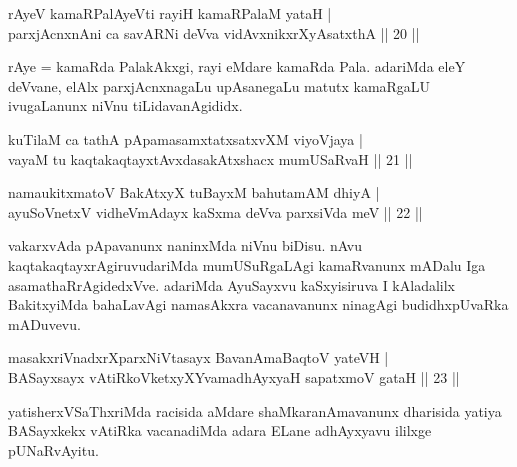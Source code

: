 \begin{shl}
rAyeV kamaRPalAyeVti rayiH kamaRPalaM yataH | \\
parxjAcnxnAni ca savARNi deVva vidAvxnikxrXyAsatxthA \hfill||  20 ||
\end{shl}

\begin{artha} 
rAye = kamaRda PalakAkxgi, rayi eMdare kamaRda Pala. adariMda eleY 
deVvane, elAlx parxjAcnxnagaLu upAsanegaLu matutx kamaRgaLU 
ivugaLanunx niVnu tiLidavanAgididx.
\end{artha}

\begin{shl}
kuTilaM ca tathA pApamasamxtatxsatxvXM viyoVjaya | \\
vayaM tu kaqtakaqtayxtAvxdasakAtxshacx mumUSaRvaH \hfill||  21 || 
\end{shl}

\begin{shl}
namaukitxmatoV BakAtxyX tuBayxM bahutamAM dhiyA | \\
ayuSoV\s netxV vidheVmAdayx kaSxma deVva parxsiVda meV \hfill||  22 || 
\end{shl}

\begin{artha} 
vakarxvAda pApavanunx naninxMda niVnu biDisu. nAvu 
kaqtakaqtayxrAgiruvudariMda mumUSuRgaLAgi kamaRvanunx mADalu Iga 
asamathaRrAgidedxVve. adariMda AyuSayxvu kaSxyisiruva I kAladalilx 
BakitxyiMda bahaLavAgi namasAkxra vacanavanunx ninagAgi budidhxpUvaRka 
mADuvevu.
\end{artha}


\begin{shl}
masakxriVnadxrXparxNiVtasayx BavanAmaBaqtoV yateVH | \\
BASayxsayx vAtiRkoVketxyXYvamadhAyxyaH sapatxmoV gataH \hfill||  23 || 
\end{shl}

\begin{artha} 
yatisherxVSaThxriMda racisida aMdare shaMkaranAmavanunx 
dharisida yatiya BASayxkekx vAtiRka vacanadiMda adara ELane adhAyxyavu 
ililxge pUNaRvAyitu.
\end{artha}

\centerline{}
